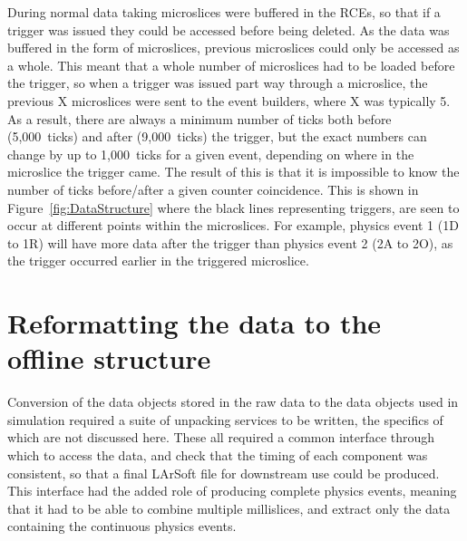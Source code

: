 During normal data taking microslices were buffered in the RCEs, so that if a trigger was issued they could be accessed before being deleted. As the data was buffered in the form of microslices, previous microslices could only be accessed as a whole. This meant that a whole number of microslices had to be loaded before the trigger, so when a trigger was issued part way through a microslice, the previous X microslices were sent to the event builders, where X was typically 5. As a result, there are always a minimum number of ticks both before (5,000~ticks) and after (9,000~ticks) the trigger, but the exact numbers can change by up to 1,000~ticks for a given event, depending on where in the microslice the trigger came. The result of this is that it is impossible to know the number of ticks before/after a given counter coincidence. This is shown in Figure~\ref{fig:DataStructure} where the black lines representing triggers, are seen to occur at different points within the microslices. For example, physics event 1 (1D to 1R) will have more data after the trigger than physics event 2 (2A to 2O), as the trigger occurred earlier in the triggered microslice.

\section{Reformatting the data to the offline structure} \label{Reformatting the data to the offline structure} %
Conversion of the data objects stored in the raw data to the data objects used in simulation required a suite of unpacking services to be written, the specifics of which are not discussed here. These all required a common interface through which to access the data, and check that the timing of each component was consistent, so that a final LArSoft file for downstream use could be produced. This interface had the added role of producing complete physics events, meaning that it had to be able to combine multiple millislices, and extract only the data containing the continuous physics events. \\

